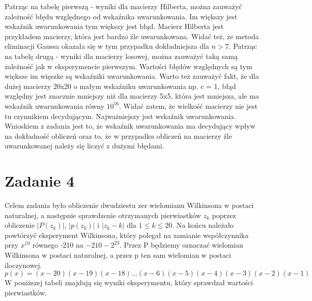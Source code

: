 \documentclass[]{article}
\begin{document}
	Patrząc na tabelę pierwszą - wyniki dla macierzy Hilberta, można zauważyć zależność błędu względnego od wskaźnika uwarunkowania. Im większy jest wskaźnik uwarunkowania tym większy jest błąd. Macierz Hilberta jest przykładem macierzy, która jest bardzo źle uwarunkowana. Widać też, że metoda eliminacji Gaussa okazała się w tym przypadku dokładniejsza dla $n>7$. \newline
	Patrząc na tabelę drugą - wyniki dla macierzy losowej, można zauważyć taką samą zależność jak w eksperymencie pierwszym. Wartości błędów względnych są tym większe im więszke są wskaźniki uwarunkowania. Warto też zauważyć fakt, że dla dużej macierzy 20x20 o małym wskaźniku uwarunkowania np. c = 1, błąd względny jest znacznie mniejszy niż dla macierzy 5x5, która jest mniejsza, ale ma wskaźnik uwarunkowania równy $10^{16}$. Widać zatem, że wielkość macierzy nie jest tu czynnikiem decydującym. Najważniejszy jest wskaźnik uwarunkowania. Wnioskiem z zadania jest to, że wskaźnik uwarunkowania ma decydujący wpływ na dokładność obliczeń oraz to, że w przypadku obliczeń na macierzy źle uwarunkowanej należy się liczyć z dużymi błędami.
	
	\section*{Zadanie 4}

	Celem zadania było obliczenie dwudziestu zer wielomianu Wilkinsona w postaci naturalnej, a następnie sprawdzenie otrzymanych pierwiastków $z_k$ poprzez obliczenie $|P(z_k)|$, $|p(z_k)|$ i $|z_k-k|$ dla $1\leq k\leq 20$. Na końcu należało powtórzyć eksperyment Wilkinsona, który polegał na zamianie współczynnika przy $x^{19}$ równego -210 na $-210 -2^{23}$. Przez P będziemy oznaczać wielomian Wilkinsona w postaci naturalnej, a przez
	p ten sam wielomian w postaci iloczynowej.	
	$$p(x) = (x-20)(x-19)(x-18)\dots(x-6)(x-5)(x-4)(x-3)(x-2)(x-1)$$
	W poniższej tabeli znajdują się wyniki eksperymentu, który sprawdzał wartości pierwiastków.
	
\end{document}
